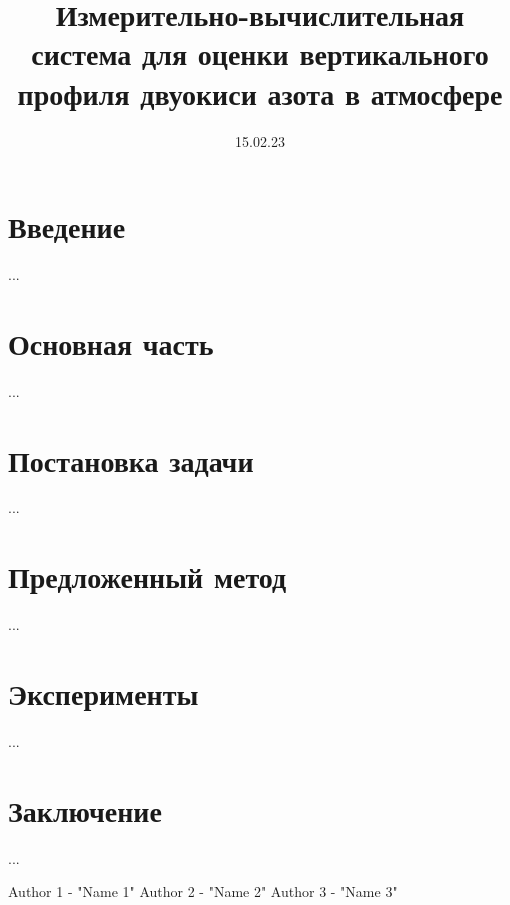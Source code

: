\documentclass[a4paper,12pt]{article}
\title{Измерительно-вычислительная система для оценки вертикального профиля двуокиси азота в атмосфере}
\date{15.02.23}
\theoremstyle{plain}
\theoremstyle{definition}
\theoremstyle{remark}
\begin{document}
\maketitle
\tableofcontents
\newpage
\section{Введение}
...
\section{Основная часть}
...
\section{Постановка задачи}
...
\section{Предложенный метод}
...
\section{Эксперименты}
...
\section{Заключение}
...

\newpage
{}
\begin{thebibliography}{}
      Author 1  -  "Name 1"
      Author 2  -  "Name 2"
      Author 3  -  "Name 3"
\end{thebibliography}
\end{document}
